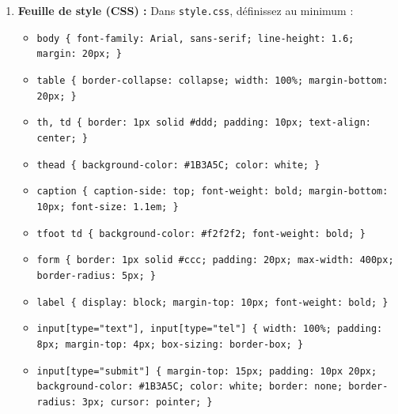 \documentclass[11pt]{article}
\begin{document}
\begin{enumerate}
\begin{itemize}
        \item Un champ « Nom complet du parent » (\texttt{<input type="text">}, obligatoire, \texttt{id="nom"}).
        \item Un champ « Numéro de téléphone (WhatsApp) » (\texttt{<input type="tel">}, motif \texttt{[0-9]\{9\}}, placeholder « 6XX XX XX XX », \texttt{id="tel"}).
        \item Un groupe « Série de l'enfant » avec trois boutons radio (\texttt{<input type="radio" name="serie" value="C">}, \texttt{D}, \texttt{E}), « D » précoché.
        \item Un bouton de soumission « Valider mon inscription ».
        \item Chaque champ doit être associé à un \texttt{<label>} via \texttt{for}/\texttt{id}.
    \end{itemize}
    \item \textbf{Feuille de style (CSS) :} Dans \texttt{style.css}, définissez au minimum :
    \begin{itemize}
        \item \texttt{body \{ font-family: Arial, sans-serif; line-height: 1.6; margin: 20px; \}}
        \item \texttt{table \{ border-collapse: collapse; width: 100\%; margin-bottom: 20px; \}}
        \item \texttt{th, td \{ border: 1px solid \#ddd; padding: 10px; text-align: center; \}}
        \item \texttt{thead \{ background-color: \#1B3A5C; color: white; \}}
        \item \texttt{caption \{ caption-side: top; font-weight: bold; margin-bottom: 10px; font-size: 1.1em; \}}
        \item \texttt{tfoot td \{ background-color: \#f2f2f2; font-weight: bold; \}}
        \item \texttt{form \{ border: 1px solid \#ccc; padding: 20px; max-width: 400px; border-radius: 5px; \}}
        \item \texttt{label \{ display: block; margin-top: 10px; font-weight: bold; \}}
        \item \texttt{input[type="text"], input[type="tel"] \{ width: 100\%; padding: 8px; margin-top: 4px; box-sizing: border-box; \}}
        \item \texttt{input[type="submit"] \{ margin-top: 15px; padding: 10px 20px; background-color: \#1B3A5C; color: white; border: none; border-radius: 3px; cursor: pointer; \}}
    \end{itemize}

\end{enumerate}
\end{document}
